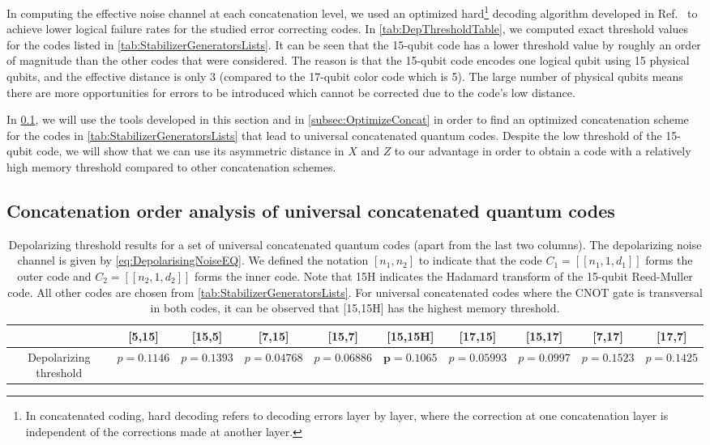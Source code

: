 \documentclass[pra,longbibliography,twocolumn,showpacs,nofootinbib,superscriptaddress,notitlepage]{revtex4-1}
\newcommand{\codepar}[1]{\ensuremath{[\![#1]\!]}}
\begin{document}
In computing the effective noise channel at each concatenation level, we used an optimized hard\footnote{In concatenated coding, hard decoding refers to decoding errors layer by layer, where the correction at one concatenation layer is independent of the corrections made at another layer.} decoding algorithm developed in Ref.~\cite{CWBL16} to achieve lower logical failure rates for the studied error correcting codes. In \cref{tab:DepThresholdTable}, we computed exact threshold values for the codes listed in \cref{tab:StabilizerGeneratorsLists}. It can be seen that the 15-qubit code has a lower threshold value by roughly an order of magnitude than the other codes that were considered. The reason is that the 15-qubit code encodes one logical qubit using 15 physical qubits, and the effective distance is only 3 (compared to the 17-qubit color code which is 5). The large number of physical qubits means there are more opportunities for errors to be introduced which cannot be corrected due to the code's low distance.

In \cref{subsec:UniversalQuantumCodes}, we will use the tools developed in this section and in \cref{subsec:OptimizeConcat} in order to find an optimized concatenation scheme for the codes in \cref{tab:StabilizerGeneratorsLists} that lead to universal concatenated quantum codes. Despite the low threshold of the 15-qubit code, we will show that we can use its asymmetric distance in $X$ and $Z$ to our advantage in order to obtain a code with a relatively high memory threshold compared to other concatenation schemes.

\subsection{Concatenation order analysis of universal concatenated quantum codes}
\label{subsec:UniversalQuantumCodes}

\begin{table*}
\begin{tabular}{ |c|c|c|c|c|c|c|c|c|c|}
\hline
& [5,15] & [15,5] & [7,15] & [15,7] & [15,15H] & [17,15] & [15,17] & [7,17] & [17,7] \\ \hline
Depolarizing threshold & $p=0.1146$ & $p=0.1393$ & $p=0.04768$ & $p=0.06886$ & $\boldsymbol{p=0.1065}$ & $p=0.05993$ & $p=0.0997$ & $p=0.1523$ & $p=0.1425$ \\ \hline
\end{tabular}
\caption{Depolarizing threshold results for a set of universal concatenated quantum codes (apart from the last two columns). The depolarizing noise channel is given by \cref{eq:DepolarisingNoiseEQ}. We defined the notation $[n_{1},n_{2}]$ to indicate that the code $C_{1} = \codepar{n_{1},1,d_{1}}$ forms the outer code and  $C_{2} = \codepar{n_{2},1,d_{2}}$ forms the inner code. Note that 15H indicates the Hadamard transform of the 15-qubit Reed-Muller code. All other codes are chosen from \cref{tab:StabilizerGeneratorsLists}. For universal concatenated codes where the CNOT gate is transversal in both codes, it can be observed that [15,15H] has the highest memory threshold.}
\label{tab:DepolarizingThresholdResults}
\end{table*}
\end{document}
